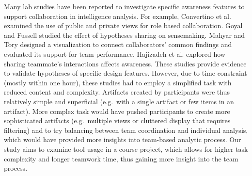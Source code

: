 Many lab studies have been reported to investigate specific awareness features
to support collaboration in intelligence analysis. For example, Convertino et al. \cite{Convertino2011} examined the use of public and private views for role based collaboration. Goyal and
Fussell \cite{Goyal2016} studied the effect of hypotheses sharing on
sensemaking. Mahyar and Tory \cite{Mahyar2013b} designed a
visualization to connect collaborators' common findings and evaluated
its support for team performance. Hajizadeh et al.
\cite{Hajizadeh2013} explored how sharing teammate's interactions
affects awareness. These studies provide evidence to validate hypotheses of specific design
features. However, due to time constraint (mostly within one hour), these studies had to employ
a simplified task with reduced content and complexity. Artifacts created by participants were thus relatively simple and superficial
(e.g.~with a single artifact or few items in an artifact). More complex
task would have pushed participants to create more sophisticated artifacts
(e.g.~multiple views or cluttered display that requires filtering) and
to try balancing between team coordination and individual analysis, which
would have provided more insights into team-based analytic process. Our study aims to examine tool usage in a course project, which allows for higher task complexity and longer teamwork time, thus gaining more insight into the team process.


